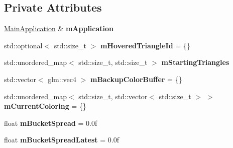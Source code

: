 \subsection*{Private Attributes}
\begin{DoxyCompactItemize}
\item 
\mbox{\label{classpepr3d_1_1_semiautomatic_segmentation_acbc1de3fdcec0222fffde0c7a4d7c943}} 
\mbox{\hyperlink{classpepr3d_1_1_main_application}{Main\+Application}} \& {\bfseries m\+Application}
\item 
\mbox{\label{classpepr3d_1_1_semiautomatic_segmentation_ada6a7bc61dd887650790d6ab7e124be0}} 
std\+::optional$<$ std\+::size\+\_\+t $>$ {\bfseries m\+Hovered\+Triangle\+Id} = \{\}
\item 
\mbox{\label{classpepr3d_1_1_semiautomatic_segmentation_a3dbfdce521caeb15d2a6ff6afe0bfd6c}} 
std\+::unordered\+\_\+map$<$ std\+::size\+\_\+t, std\+::size\+\_\+t $>$ {\bfseries m\+Starting\+Triangles}
\item 
\mbox{\label{classpepr3d_1_1_semiautomatic_segmentation_a0edb6cea56b65770a0198afa0327f95a}} 
std\+::vector$<$ glm\+::vec4 $>$ {\bfseries m\+Backup\+Color\+Buffer} = \{\}
\item 
\mbox{\label{classpepr3d_1_1_semiautomatic_segmentation_aa11a69bd21677ed61f031742bc9f70b9}} 
std\+::unordered\+\_\+map$<$ std\+::size\+\_\+t, std\+::vector$<$ std\+::size\+\_\+t $>$ $>$ {\bfseries m\+Current\+Coloring} = \{\}
\item 
\mbox{\label{classpepr3d_1_1_semiautomatic_segmentation_a14ee2f3433e625c292873dc40d59ded7}} 
float {\bfseries m\+Bucket\+Spread} = 0.\+0f
\item 
\mbox{\label{classpepr3d_1_1_semiautomatic_segmentation_abf0842f9b84704f6bd1f573d3cd9d71f}} 
float {\bfseries m\+Bucket\+Spread\+Latest} = 0.\+0f
\item 
\mbox{\label{classpepr3d_1_1_semiautomatic_segmentation_ac5fdb732b042108da0a96fa2376d6f25}} 

\end{DoxyCompactItemize}
